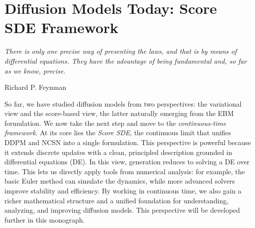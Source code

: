 \chapter{Diffusion Models Today: Score SDE Framework}\label{ch:score-sde}

\epigraph{
    \textit{There is only one precise way of presenting the laws, and that is by means of differential equations. They have the advantage of being fundamental and, so far as we know, precise.
}}{Richard P. Feynman}



So far, we have studied diffusion models from two perspectives: the variational view and the score-based view, the latter naturally emerging from the EBM formulation. We now take the next step and move to the \emph{continuous-time framework}. At its core lies the \emph{Score SDE}, the continuous limit that unifies DDPM and NCSN into a single formulation. This perspective is powerful because it extends discrete updates with a clean, principled description grounded in differential equations (DE).
In this view, generation reduces to solving a DE over time. This lets us directly apply tools from numerical analysis: for example, the basic Euler method can simulate the dynamics, while more advanced solvers improve stability and efficiency.
By working in continuous time, we also gain a richer mathematical structure and a unified foundation for understanding, analyzing, and improving diffusion models. This perspective will be developed further in this monograph.






\newpage

